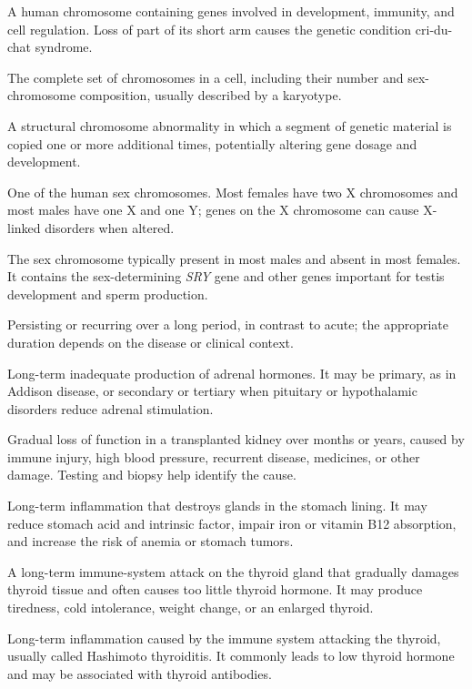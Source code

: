  A human chromosome containing genes involved in development, immunity, and cell regulation. Loss of part of its short arm causes the genetic condition cri-du-chat syndrome.

 The complete set of chromosomes in a cell, including their number and sex-chromosome composition, usually described by a karyotype.

 A structural chromosome abnormality in which a segment of genetic material is copied one or more additional times, potentially altering gene dosage and development.

 One of the human sex chromosomes. Most females have two X chromosomes and most males have one X and one Y; genes on the X chromosome can cause X-linked disorders when altered.

 The sex chromosome typically present in most males and absent in most females. It contains the sex-determining \textit{SRY} gene and other genes important for testis development and sperm production.

 Persisting or recurring over a long period, in contrast to acute; the appropriate duration depends on the disease or clinical context.

 Long-term inadequate production of adrenal hormones. It may be primary, as in Addison disease, or secondary or tertiary when pituitary or hypothalamic disorders reduce adrenal stimulation.

 Gradual loss of function in a transplanted kidney over months or years, caused by immune injury, high blood pressure, recurrent disease, medicines, or other damage. Testing and biopsy help identify the cause.

 Long-term inflammation that destroys glands in the stomach lining. It may reduce stomach acid and intrinsic factor, impair iron or vitamin B12 absorption, and increase the risk of anemia or stomach tumors.

 A long-term immune-system attack on the thyroid gland that gradually damages thyroid tissue and often causes too little thyroid hormone. It may produce tiredness, cold intolerance, weight change, or an enlarged thyroid.

 Long-term inflammation caused by the immune system attacking the thyroid, usually called Hashimoto thyroiditis. It commonly leads to low thyroid hormone and may be associated with thyroid antibodies.

